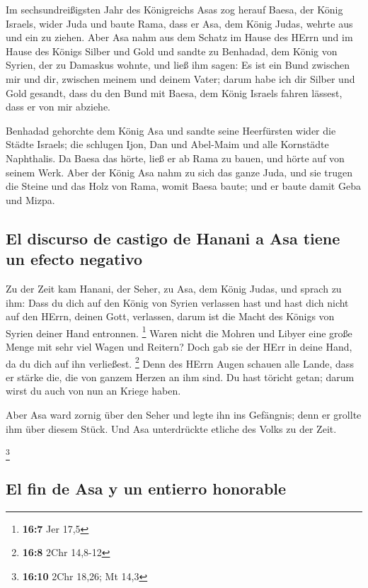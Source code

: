  Im sechsundreißigsten Jahr des Königreichs Asas zog
herauf Baesa, der König Israels, wider Juda und baute Rama, dass er Asa,
dem König Judas, wehrte aus und ein zu ziehen.  Aber Asa
nahm aus dem Schatz im Hause des HErrn und im Hause des Königs Silber
und Gold und sandte zu Benhadad, dem König von Syrien, der zu Damaskus
wohnte, und ließ ihm sagen:  Es ist ein Bund zwischen mir
und dir, zwischen meinem und deinem Vater; darum habe ich dir Silber und
Gold gesandt, dass du den Bund mit Baesa, dem König Israels fahren
lässest, dass er von mir abziehe.

 Benhadad gehorchte dem König Asa und sandte seine
Heerfürsten wider die Städte Israels; die schlugen Ijon, Dan und
Abel-Maim und alle Kornstädte Naphthalis.  Da Baesa das
hörte, ließ er ab Rama zu bauen, und hörte auf von seinem Werk.
 Aber der König Asa nahm zu sich das ganze Juda, und sie
trugen die Steine und das Holz von Rama, womit Baesa baute; und er baute
damit Geba und Mizpa.

\hypertarget{el-discurso-de-castigo-de-hanani-a-asa-tiene-un-efecto-negativo}{%
\subsection{El discurso de castigo de Hanani a Asa tiene un efecto
negativo}\label{el-discurso-de-castigo-de-hanani-a-asa-tiene-un-efecto-negativo}}

 Zu der Zeit kam Hanani, der Seher, zu Asa, dem König
Judas, und sprach zu ihm: Dass du dich auf den König von Syrien
verlassen hast und hast dich nicht auf den HErrn, deinen Gott,
verlassen, darum ist die Macht des Königs von Syrien deiner Hand
entronnen. \footnote{\textbf{16:7} Jer 17,5}  Waren nicht
die Mohren und Libyer eine große Menge mit sehr viel Wagen und Reitern?
Doch gab sie der HErr in deine Hand, da du dich auf ihn verließest.
\footnote{\textbf{16:8} 2Chr 14,8-12}  Denn des HErrn
Augen schauen alle Lande, dass er stärke die, die von ganzem Herzen an
ihm sind. Du hast töricht getan; darum wirst du auch von nun an Kriege
haben.

 Aber Asa ward zornig über den Seher und legte ihn ins
Gefängnis; denn er grollte ihm über diesem Stück. Und Asa unterdrückte
etliche des Volks zu der Zeit.

\footnote{\textbf{16:10} 2Chr 18,26; Mt 14,3}

\hypertarget{el-fin-de-asa-y-un-entierro-honorable}{%
\subsection{El fin de Asa y un entierro
honorable}\label{el-fin-de-asa-y-un-entierro-honorable}}

